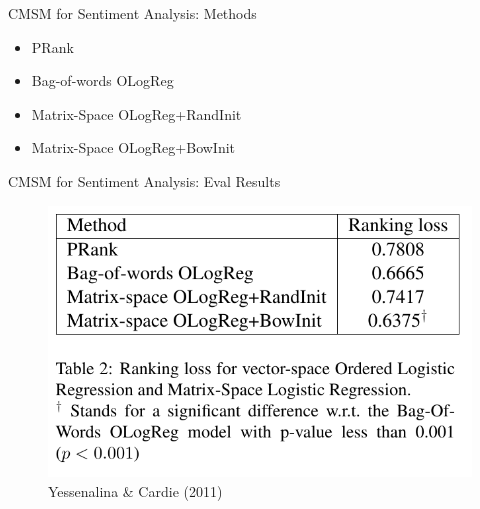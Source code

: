 \documentclass[12pt,a4paper]{beamer}
\begin{document}
\begin{frame}{CMSM for Sentiment Analysis: Methods}
\begin{itemize}
\item PRank
\item Bag-of-words OLogReg
\item Matrix-Space OLogReg+RandInit
\item Matrix-Space OLogReg+BowInit
\end{itemize}
\end{frame}



\begin{frame}{CMSM for Sentiment Analysis: Eval Results}

\begin{figure}
\includegraphics[width=\textwidth]{cmsm_for_se_table2.png}
\caption{Yessenalina \&  Cardie (2011)}
\end{figure}
\end{frame}
\end{document}
